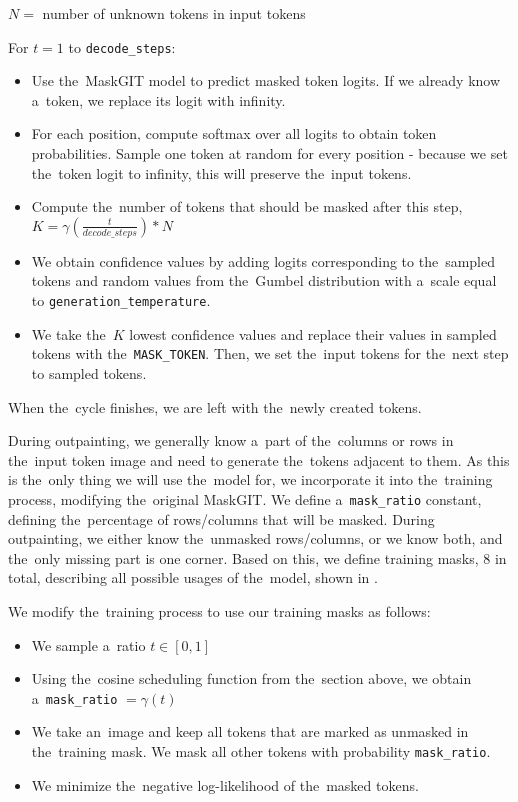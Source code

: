 $N =$ number of unknown tokens in input tokens

For $t = 1$ to \texttt{decode\_steps}:
\begin{itemize}
\item Use the~MaskGIT model to predict masked token logits. If we already know a~token, we replace its logit with infinity.
\item For each position, compute softmax over all logits to obtain token probabilities. Sample one token at random for every position - because we set the~token logit to infinity, this will preserve the~input tokens.
\item Compute the~number of tokens that should be masked after this step, $K=\gamma(\frac{t}{decode\_steps}) * N$
\item We obtain confidence values by adding logits corresponding to the~sampled tokens and random values from the~Gumbel distribution with a~scale equal to \texttt{generation\_temperature}.
\item We take the~$K$ lowest confidence values and replace their values in sampled tokens with the~\texttt{MASK\_TOKEN}. Then, we set the~input tokens for the~next step to sampled tokens.
\end{itemize}

When the~cycle finishes, we are left with the~newly created tokens.

During outpainting, we generally know a~part of the~columns or rows in the~input token image and need to generate the~tokens adjacent to them. As this is the~only thing we will use the~model for, we incorporate it into the~training process, modifying the~original MaskGIT. We define a~\texttt{mask\_ratio} constant, defining the~percentage of rows/columns that will be masked. During outpainting, we either know the~unmasked rows/columns, or we know both, and the~only missing part is one corner. Based on this, we define training masks, 8 in total, describing all possible usages of the~model, shown in .



We modify the~training process to use our training masks as follows:

\begin{itemize}
\item We sample a~ratio $t \in [0, 1]$
\item Using the~cosine scheduling function from the~section above, we obtain a~\texttt{mask\_ratio} $= \gamma(t)$
\item We take an~image and keep all tokens that are marked as unmasked in the~training mask. We mask all other tokens with probability \texttt{mask\_ratio}.
\item We minimize the~negative log-likelihood of the~masked tokens.
\end{itemize}




